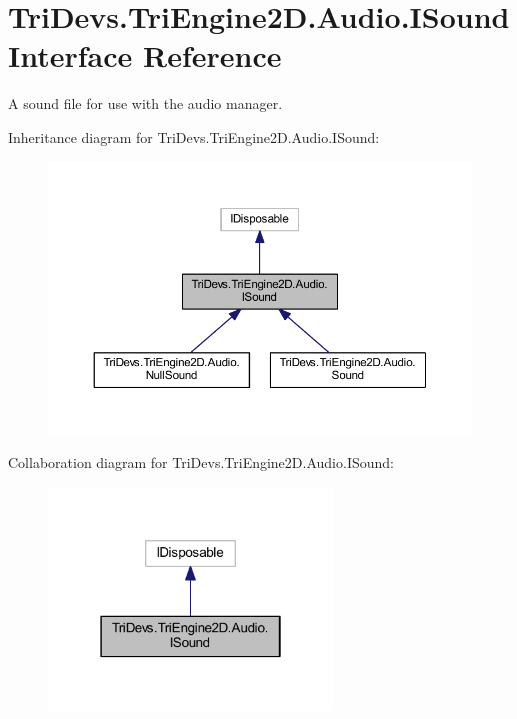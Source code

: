 \hypertarget{interface_tri_devs_1_1_tri_engine2_d_1_1_audio_1_1_i_sound}{\section{Tri\-Devs.\-Tri\-Engine2\-D.\-Audio.\-I\-Sound Interface Reference}
\label{interface_tri_devs_1_1_tri_engine2_d_1_1_audio_1_1_i_sound}
}


A sound file for use with the audio manager.  




Inheritance diagram for Tri\-Devs.\-Tri\-Engine2\-D.\-Audio.\-I\-Sound\-:
\nopagebreak
\begin{figure}[H]
\begin{center}
\leavevmode
\includegraphics[width=350pt]{interface_tri_devs_1_1_tri_engine2_d_1_1_audio_1_1_i_sound__inherit__graph}
\end{center}
\end{figure}


Collaboration diagram for Tri\-Devs.\-Tri\-Engine2\-D.\-Audio.\-I\-Sound\-:
\nopagebreak
\begin{figure}[H]
\begin{center}
\leavevmode
\includegraphics[width=214pt]{interface_tri_devs_1_1_tri_engine2_d_1_1_audio_1_1_i_sound__coll__graph}
\end{center}
\end{figure}
